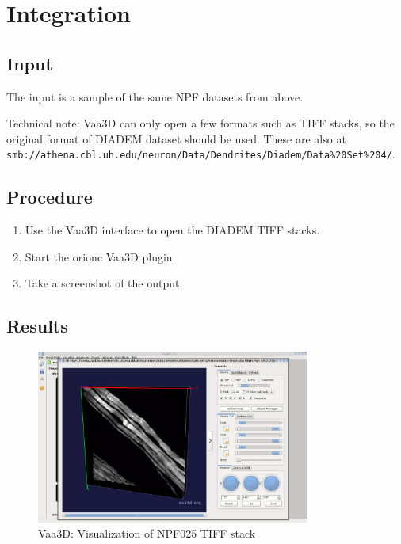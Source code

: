 \documentclass[12pt]{article}
\begin{document}
\section{Integration}

\subsection{Input}

The input is a sample of the same NPF datasets from above.

Technical note: Vaa3D can only open a few formats such as TIFF stacks, so the
original format of DIADEM dataset should be used. These are also at
\nolinkurl{smb://athena.cbl.uh.edu/neuron/Data/Dendrites/Diadem/Data\%20Set\%204/}.

\subsection{Procedure}

\begin{enumerate}
	\item Use the Vaa3D interface to open the DIADEM TIFF stacks.
	\item Start the \gls{orionc} Vaa3D plugin.
	\item Take a screenshot of the output.
\end{enumerate}

\subsection{Results}

\begin{figure}[H]
\centering
\includegraphics[width=0.8\textwidth]{gfx/vaa3d_DIADEM-NPF-3-025_3D-view}
\caption{Vaa3D: Visualization of NPF025 TIFF stack}
\end{figure}
\end{document}
